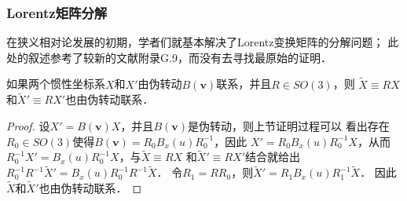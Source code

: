 \subsubsection{Lorentz矩阵分解}
在狭义相对论发展的初期，学者们就基本解决了Lorentz变换矩阵的分解问题；
此处的叙述参考了较新的文献\parencite{liang_zhou2009_2}附录G.9，而没有去寻找最原始的证明．




\begin{proposition}\label{chlg:thm_xx-txtx}
    如果两个惯性坐标系$X$和$X'$由伪转动$B(\boldsymbol{v})$联系，并且$R\in SO(3)$，则
    $\tilde{X}\equiv RX$和$\tilde{X}'\equiv RX'$也由伪转动联系．
\end{proposition}
\begin{proof}
    设$X'=B(\boldsymbol{v})X$，并且$B(\boldsymbol{v})$是伪转动，则上节证明过程可以
    看出存在$R_0\in SO(3)$使得$B(\boldsymbol{v})=R_0B_x(u)R_0^{-1}$，因此
    $X'=R_0B_x(u)R_0^{-1}X$，从而$R_0^{-1}X'=B_x(u)R_0^{-1}X$，与$\tilde{X}\equiv RX$
    和$\tilde{X}'\equiv RX'$结合就给出$R_0^{-1}R^{-1}\tilde{X}'=B_x(u)R_0^{-1}R^{-1}\tilde{X}$．
    令$R_1 = RR_0$，则$\tilde{X}'=R_{1}B_x(u)R_1^{-1}\tilde{X}$．
    因此$\tilde{X}$和$\tilde{X}'$也由伪转动联系．
\end{proof}


